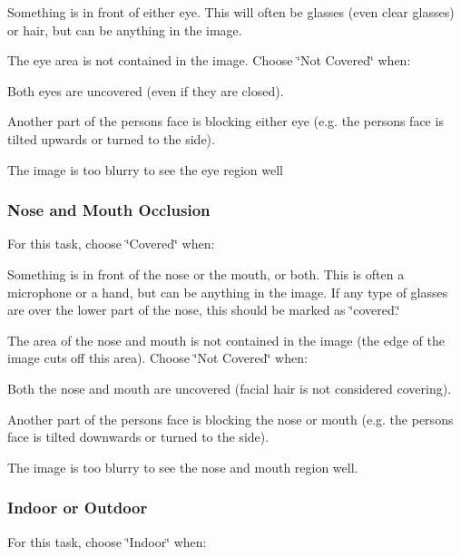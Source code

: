 \begin{DoxyItemize}
\item Something is in front of either eye. This will often be glasses (even clear glasses) or hair, but can be anything in the image.
\item The eye area is not contained in the image. Choose \char`\"{}\+Not Covered\char`\"{} when\+:
\item Both eyes are uncovered (even if they are closed).
\item Another part of the person\textquotesingle{}s face is blocking either eye (e.\+g. the person\textquotesingle{}s face is tilted upwards or turned to the side).
\item The image is too blurry to see the eye region well
\end{DoxyItemize}\hypertarget{group__janus_nose_mouth_visible}{}\subsubsection{Nose and Mouth Occlusion}\label{group__janus_nose_mouth_visible}
For this task, choose \char`\"{}\+Covered\char`\"{} when\+:
\begin{DoxyItemize}
\item Something is in front of the nose or the mouth, or both. This is often a microphone or a hand, but can be anything in the image. If any type of glasses are over the lower part of the nose, this should be marked as \char`\"{}covered.\char`\"{}
\item The area of the nose and mouth is not contained in the image (the edge of the image cuts off this area). Choose \char`\"{}\+Not Covered\char`\"{} when\+:
\item Both the nose and mouth are uncovered (facial hair is not considered \textquotesingle{}covering\textquotesingle{}).
\item Another part of the person\textquotesingle{}s face is blocking the nose or mouth (e.\+g. the person\textquotesingle{}s face is tilted downwards or turned to the side).
\item The image is too blurry to see the nose and mouth region well.
\end{DoxyItemize}\hypertarget{group__janus_indoor}{}\subsubsection{Indoor or Outdoor}\label{group__janus_indoor}
For this task, choose \char`\"{}\+Indoor\char`\"{} when\+:
